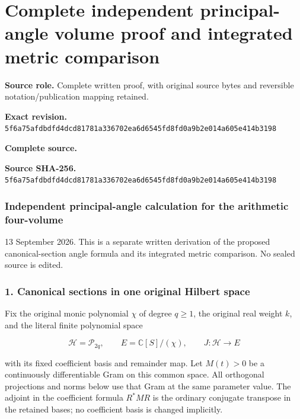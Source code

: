 \begingroup

\section{Complete independent principal-angle volume proof and integrated metric comparison}


\begingroup
\sloppy
\small

\noindent\textbf{Source role.} Complete written proof, with original source bytes and reversible notation/publication mapping retained.\par
\noindent\textbf{Exact revision.} \nolinkurl{5f6a75afdbdfd4dcd81781a336702ea6d6545fd8fd0a9b2e014a605e414b3198}\par
\noindent\textbf{Complete source.} \par
\noindent\textbf{Source SHA-256.} \nolinkurl{5f6a75afdbdfd4dcd81781a336702ea6d6545fd8fd0a9b2e014a605e414b3198}\par\medskip
\subsubsection{Independent principal-angle calculation for the arithmetic four-volume}\label{endpoint-principal_angle_volume_review--independent-principal-angle-calculation-for-the-arithmetic-four-volume}

13 September 2026. This is a separate written derivation of the proposed canonical-section angle formula and its integrated metric comparison. No sealed source is edited.

\subsubsection{1. Canonical sections in one original Hilbert space}\label{endpoint-principal_angle_volume_review--canonical-sections-in-one-original-hilbert-space}

Fix the original monic polynomial \(\chi\) of degree \(q\ge1\), the original real weight \(k\), and the literal finite polynomial space

\[
\mathcal H=\mathcal P_{2q},\qquad
E=\mathbb C[S]/(\chi),\qquad
J:\mathcal H\longrightarrow E
\tag{PA1}
\]

with its fixed coefficient basis and remainder map. Let \(M(t)>0\) be a continuously differentiable Gram on this common space. All orthogonal projections and norms below use that Gram at the same parameter value. The adjoint in the coefficient formula \(R^*MR\) is the ordinary conjugate transpose in the retained bases; no coefficient basis is changed implicitly.

